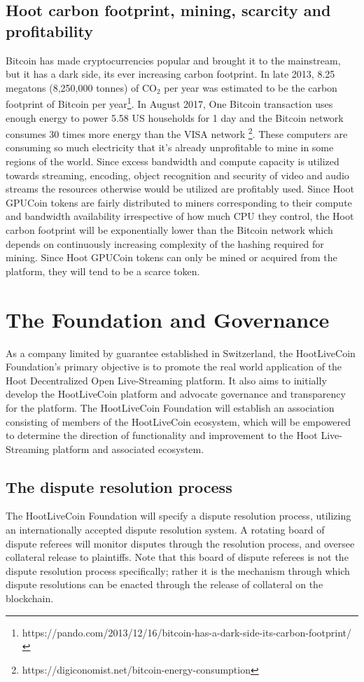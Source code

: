 \documentclass{article}
\begin{document}
\subsection{Hoot carbon footprint, mining, scarcity and profitability}
Bitcoin has made cryptocurrencies popular and brought it to the mainstream, but it has a dark side, its ever increasing carbon footprint. In late 2013, 8.25 megatons (8,250,000 tonnes) of CO$_2$ per year
was estimated to be the carbon footprint of Bitcoin per year\footnote{https://pando.com/2013/12/16/bitcoin-has-a-dark-side-its-carbon-footprint/}. In August 2017, One Bitcoin transaction uses enough energy to power 5.58 US households for 1 day and the Bitcoin network consumes 30 times more energy than the VISA network \footnote{https://digiconomist.net/bitcoin-energy-consumption}. These
computers are consuming so much electricity that it’s already unprofitable to mine in some regions of the world. Since excess bandwidth and compute capacity is utilized towards streaming, encoding, object recognition
and security of video and audio streams the resources otherwise would be utilized are profitably used. Since Hoot GPUCoin tokens are fairly distributed to miners corresponding to their compute and bandwidth availability irrespective of how much CPU they control, the Hoot carbon footprint will be exponentially lower than the Bitcoin network which depends on continuously increasing complexity of the hashing required for mining. Since Hoot GPUCoin tokens can only be mined or acquired from the platform, they will tend to be a scarce token.

\section{The Foundation and Governance} %
\label{sec:the_foundation_and_governance}
As a company limited by guarantee established in Switzerland, the HootLiveCoin Foundation's primary objective is to promote the real world application of the Hoot Decentralized Open Live-Streaming platform. It also aims to initially develop the HootLiveCoin platform and advocate governance and transparency for the platform. The HootLiveCoin Foundation will establish an association consisting of members of the HootLiveCoin ecosystem, which will be empowered to determine the direction of functionality and improvement to the Hoot Live-Streaming platform and associated ecosystem.

\subsection{The dispute resolution process} %
\label{sub:the_dispute_resolution_process}
The HootLiveCoin Foundation will specify a dispute resolution process, utilizing an internationally accepted dispute resolution system. A rotating board of dispute referees will monitor disputes through the resolution process, and oversee collateral release to plaintiffs. Note that this board of dispute referees is not the dispute resolution process specifically; rather it is the mechanism through which dispute resolutions can be enacted through the release of collateral on the blockchain.
\end{document}

